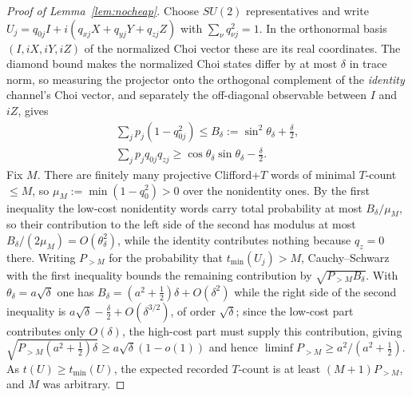 \documentclass[aps,prx,twocolumn,superscriptaddress,nofootinbib,longbibliography]{revtex4-2}
\theoremstyle{plain}
\theoremstyle{definition}
\theoremstyle{remark}
\begin{document}
\begin{proof}[Proof of Lemma~\ref{lem:nocheap}]
Choose $SU(2)$ representatives and write $U_j=q_{0j}I+i(q_{xj}X+q_{yj}Y+q_{zj}Z)$ with $\sum_\nu q_{\nu j}^2=1$. In the orthonormal basis $(I,iX,iY,iZ)$ of the normalized Choi vector these are its real coordinates. The diamond bound makes the normalized Choi states differ by at most $\delta$ in trace norm, so measuring the projector onto the orthogonal complement of the \emph{identity} channel's Choi vector, and separately the off-diagonal observable between $I$ and $iZ$, gives
\[
\begin{gathered}
\sum_jp_j(1-q_{0j}^2)\le B_\delta:=\sin^2\theta_\delta+\tfrac\delta2,\\
\sum_jp_jq_{0j}q_{zj}\ge\cos\theta_\delta\sin\theta_\delta-\tfrac\delta2 .
\end{gathered}
\]
Fix $M$. There are finitely many projective Clifford+$T$ words of minimal $T$-count $\le M$, so $\mu_M:=\min(1-q_0^2)>0$ over the nonidentity ones. By the first inequality the low-cost nonidentity words carry total probability at most $B_\delta/\mu_M$, so their contribution to the left side of the second has modulus at most $B_\delta/(2\mu_M)=O(\theta_\delta^2)$, while the identity contributes nothing because $q_z=0$ there. Writing $P_{>M}$ for the probability that $t_{\min}(U_j)>M$, Cauchy--Schwarz with the first inequality bounds the remaining contribution by $\sqrt{P_{>M}B_\delta}$. With $\theta_\delta=a\sqrt\delta$ one has $B_\delta=(a^2+\tfrac12)\delta+O(\delta^2)$ while the right side of the second inequality is $a\sqrt\delta-\tfrac\delta2+O(\delta^{3/2})$, of order $\sqrt\delta$; since the low-cost part contributes only $O(\delta)$, the high-cost part must supply this contribution, giving $\sqrt{P_{>M}(a^2+\tfrac12)\delta}\ge a\sqrt\delta(1-o(1))$ and hence $\liminf P_{>M}\ge a^2/(a^2+\tfrac12)$. As $t(U)\ge t_{\min}(U)$, the expected recorded $T$-count is at least $(M+1)P_{>M}$, and $M$ was arbitrary.
\end{proof}
\end{document}
